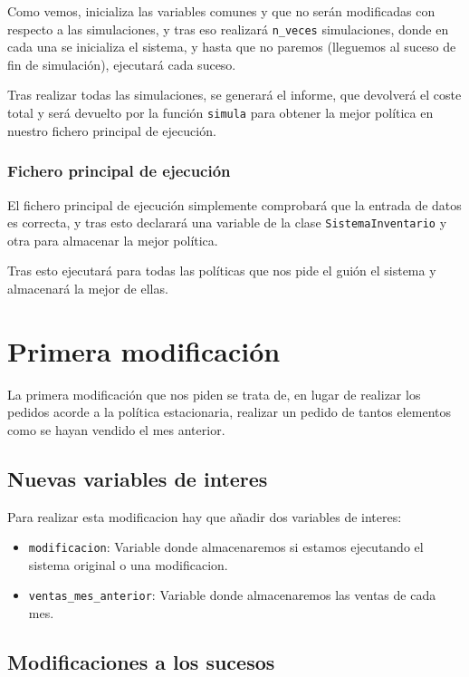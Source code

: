 \documentclass[12pt, spanish]{article}
\begin{document}
Como vemos, inicializa las variables comunes y que no serán modificadas con respecto a las simulaciones, y tras eso realizará \texttt{n\_veces} simulaciones, donde en cada una se inicializa el sistema, y hasta que no paremos (lleguemos al suceso de fin de simulación), ejecutará cada suceso.

Tras realizar todas las simulaciones, se generará el informe, que devolverá el coste total y será devuelto por la función \texttt{simula} para obtener la mejor política en nuestro fichero principal de ejecución.

\subsubsection{Fichero principal de ejecución}

El fichero principal de ejecución simplemente comprobará que la entrada de datos es correcta, y tras esto declarará una variable de la clase \texttt{SistemaInventario} y otra para almacenar la mejor política.

Tras esto ejecutará para todas las políticas que nos pide el guión el sistema y almacenará la mejor de ellas.



\section{Primera modificación}

La primera modificación que nos piden se trata de, en lugar de realizar los pedidos acorde a la política estacionaria, realizar un pedido de tantos elementos como se hayan vendido el mes anterior.

\subsection{Nuevas variables de interes}

Para realizar esta modificacion hay que añadir dos variables de interes:

\begin{itemize}
	\item \texttt{modificacion}: Variable donde almacenaremos si estamos ejecutando el sistema original o una modificacion.
	\item \texttt{ventas\_mes\_anterior}: Variable donde almacenaremos las ventas de cada mes.
\end{itemize}

\subsection{Modificaciones a los sucesos}
\end{document}
